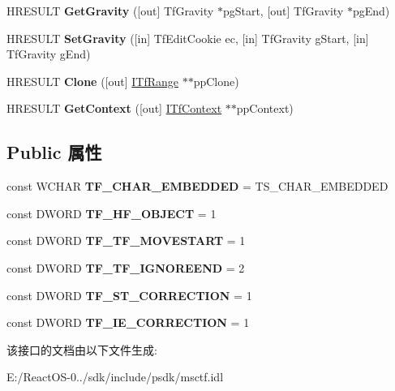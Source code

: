 \begin{DoxyCompactItemize}
H\+R\+E\+S\+U\+LT {\bfseries Get\+Gravity} (\mbox{[}out\mbox{]} Tf\+Gravity $\ast$pg\+Start, \mbox{[}out\mbox{]} Tf\+Gravity $\ast$pg\+End)
\item 
\mbox{\label{interface_i_tf_range_ad509ebcab19644cd074cc9d7ab415e82}} 
H\+R\+E\+S\+U\+LT {\bfseries Set\+Gravity} (\mbox{[}in\mbox{]} Tf\+Edit\+Cookie ec, \mbox{[}in\mbox{]} Tf\+Gravity g\+Start, \mbox{[}in\mbox{]} Tf\+Gravity g\+End)
\item 
\mbox{\label{interface_i_tf_range_a31a537cba0106f59d9b0e70966204f32}} 
H\+R\+E\+S\+U\+LT {\bfseries Clone} (\mbox{[}out\mbox{]} \hyperlink{interface_i_tf_range}{I\+Tf\+Range} $\ast$$\ast$pp\+Clone)
\item 
\mbox{\label{interface_i_tf_range_a6c39e2c511753325cea83d071570c4be}} 
H\+R\+E\+S\+U\+LT {\bfseries Get\+Context} (\mbox{[}out\mbox{]} \hyperlink{interface_i_tf_context}{I\+Tf\+Context} $\ast$$\ast$pp\+Context)
\end{DoxyCompactItemize}
\subsection*{Public 属性}
\begin{DoxyCompactItemize}
\item 
\mbox{\label{interface_i_tf_range_aa1537f559136a65b49867b2fbbd8a2b9}} 
const W\+C\+H\+AR {\bfseries T\+F\+\_\+\+C\+H\+A\+R\+\_\+\+E\+M\+B\+E\+D\+D\+ED} = T\+S\+\_\+\+C\+H\+A\+R\+\_\+\+E\+M\+B\+E\+D\+D\+ED
\item 
\mbox{\label{interface_i_tf_range_a01028a24e2ef8630ca761aa9fa7b22db}} 
const D\+W\+O\+RD {\bfseries T\+F\+\_\+\+H\+F\+\_\+\+O\+B\+J\+E\+CT} = 1
\item 
\mbox{\label{interface_i_tf_range_a2a01c4611d2b87969fe9bb46ccf58857}} 
const D\+W\+O\+RD {\bfseries T\+F\+\_\+\+T\+F\+\_\+\+M\+O\+V\+E\+S\+T\+A\+RT} = 1
\item 
\mbox{\label{interface_i_tf_range_ac0a98fe8715e895a7c9e555ddc3a67f7}} 
const D\+W\+O\+RD {\bfseries T\+F\+\_\+\+T\+F\+\_\+\+I\+G\+N\+O\+R\+E\+E\+ND} = 2
\item 
\mbox{\label{interface_i_tf_range_a3c3b94dd26e4955d1031c958276c6e2f}} 
const D\+W\+O\+RD {\bfseries T\+F\+\_\+\+S\+T\+\_\+\+C\+O\+R\+R\+E\+C\+T\+I\+ON} = 1
\item 
\mbox{\label{interface_i_tf_range_ad4c7c6fd6490e9300afa691e5f5d4b18}} 
const D\+W\+O\+RD {\bfseries T\+F\+\_\+\+I\+E\+\_\+\+C\+O\+R\+R\+E\+C\+T\+I\+ON} = 1
\end{DoxyCompactItemize}


该接口的文档由以下文件生成\+:\begin{DoxyCompactItemize}
\item 
E\+:/\+React\+O\+S-\/0../sdk/include/psdk/msctf.\+idl\end{DoxyCompactItemize}
